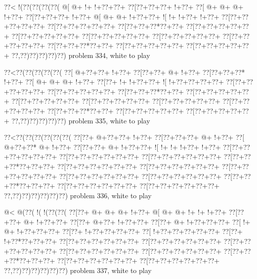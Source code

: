 \vbox{\vbox{\goo
\0??<\- !(\0??(\0??(\0??(\0??(
\- @[\- @+\- !+\- !+\0??+\0??+
\0??[\0??+\0??+\0??+\- !+\0??+
\0??[\- @+\- @+\- @+\- !+\0??+
\0??[\0??+\0??+\0??+\- !+\0??+
\- @[\- @+\- @+\- !+\0??+\0??+
\- ![\- !+\- !+\0??+\- !+\0??+
\0??[\0??+\0??+\0??+\0??+\0??+
\0??[\0??+\0??+\0??+\0??+\0??+
\0??[\0??+\0??+\0??*\0??+\0??+
\0??[\0??+\0??+\0??+\0??+\0??+
\0??[\0??+\0??+\0??+\0??+\0??+
\0??[\0??+\0??+\0??+\0??+\0??+
\0??[\0??+\0??+\0??+\0??+\0??+
\0??[\0??+\0??+\0??+\0??+\0??+
\0??[\0??+\0??+\0??*\0??+\0??+
\0??[\0??+\0??+\0??+\0??+\0??+
\0??[\0??+\0??+\0??+\0??+\0??+
\0??,\0??)\0??)\0??)\0??)\0??)
}
\hfil problem 334, white to play\hfil\break
}

\vbox{\vbox{\goo
\0??<\0??(\0??(\0??(\0??(\0??(
\0??[\- @+\0??+\0??+\- !+\0??+
\0??[\0??+\0??+\- @+\- !+\0??+
\0??[\0??+\0??+\0??*\- !+\0??+
\0??[\- @+\- @+\- @+\- !+\0??+
\0??[\0??+\- !+\- !+\0??+\0??+
\- ![\- !+\0??+\0??+\0??+\0??+
\0??[\0??+\0??+\0??+\0??+\0??+
\0??[\0??+\0??+\0??+\0??+\0??+
\0??[\0??+\0??+\0??*\0??+\0??+
\0??[\0??+\0??+\0??+\0??+\0??+
\0??[\0??+\0??+\0??+\0??+\0??+
\0??[\0??+\0??+\0??+\0??+\0??+
\0??[\0??+\0??+\0??+\0??+\0??+
\0??[\0??+\0??+\0??+\0??+\0??+
\0??[\0??+\0??+\0??*\0??+\0??+
\0??[\0??+\0??+\0??+\0??+\0??+
\0??[\0??+\0??+\0??+\0??+\0??+
\0??,\0??)\0??)\0??)\0??)\0??)
}
\hfil problem 335, white to play\hfil\break
}

\vbox{\vbox{\goo
\0??<\0??(\0??(\0??(\0??(\0??(\0??(
\0??[\0??+\- @+\0??+\0??+\- !+\0??+
\0??[\0??+\0??+\0??+\- @+\- !+\0??+
\0??[\- @+\0??+\0??*\- @+\- !+\0??+
\0??[\0??+\0??+\- @+\- !+\0??+\0??+
\- ![\- !+\- !+\- !+\0??+\- !+\0??+
\0??[\0??+\0??+\0??+\0??+\0??+\0??+
\0??[\0??+\0??+\0??+\0??+\0??+\0??+
\0??[\0??+\0??+\0??+\0??+\0??+\0??+
\0??[\0??+\0??+\0??*\0??+\0??+\0??+
\0??[\0??+\0??+\0??+\0??+\0??+\0??+
\0??[\0??+\0??+\0??+\0??+\0??+\0??+
\0??[\0??+\0??+\0??+\0??+\0??+\0??+
\0??[\0??+\0??+\0??+\0??+\0??+\0??+
\0??[\0??+\0??+\0??+\0??+\0??+\0??+
\0??[\0??+\0??+\0??*\0??+\0??+\0??+
\0??[\0??+\0??+\0??+\0??+\0??+\0??+
\0??[\0??+\0??+\0??+\0??+\0??+\0??+
\0??,\0??)\0??)\0??)\0??)\0??)\0??)
}
\hfil problem 336, white to play\hfil\break
}

\vbox{\vbox{\goo
\- @<\- @(\0??(\- !(\- !(\0??(\0??(
\0??[\0??+\- @+\- @+\- @+\- !+\0??+
\- @[\- @+\- @+\- !+\- !+\- !+\0??+
\0??[\0??+\0??+\- @+\- !+\0??+\0??+
\0??[\0??+\- @+\0??+\- !+\0??+\0??+
\0??[\0??+\- @+\- !+\0??+\0??+\0??+
\0??[\- !+\- @+\- !+\0??+\0??+\0??+
\0??[\0??+\- !+\0??+\0??+\0??+\0??+
\0??[\- !+\0??+\0??+\0??+\0??+\0??+
\0??[\0??+\- !+\0??*\0??+\0??+\0??+
\0??[\0??+\0??+\0??+\0??+\0??+\0??+
\0??[\0??+\0??+\0??+\0??+\0??+\0??+
\0??[\0??+\0??+\0??+\0??+\0??+\0??+
\0??[\0??+\0??+\0??+\0??+\0??+\0??+
\0??[\0??+\0??+\0??+\0??+\0??+\0??+
\0??[\0??+\0??+\0??*\0??+\0??+\0??+
\0??[\0??+\0??+\0??+\0??+\0??+\0??+
\0??[\0??+\0??+\0??+\0??+\0??+\0??+
\0??,\0??)\0??)\0??)\0??)\0??)\0??)
}
\hfil problem 337, white to play\hfil\break
}

